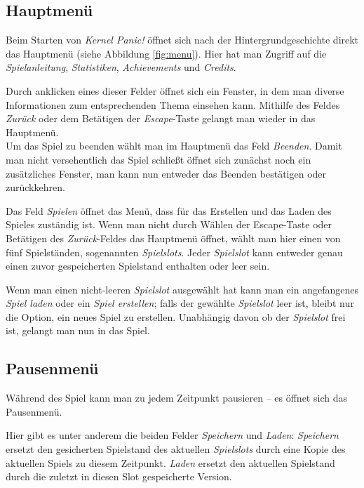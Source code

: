 \subsection{Hauptmenü}\label{sec:menu-main}

Beim Starten von \textit{Kernel Panic!} öffnet sich nach der Hintergrundgeschichte direkt das Hauptmenü (siehe Abbildung \ref{fig:menu}). Hier hat man Zugriff auf die \textit{Spielanleitung}, \textit{Statistiken}, \textit{Achievements} und \textit{Credits}.

Durch anklicken eines dieser Felder öffnet sich ein Fenster, in dem man diverse
Informationen zum entsprechenden Thema einsehen kann. Mithilfe des Feldes
\textit{Zurück} oder dem Betätigen der \textit{Escape}-Taste gelangt man wieder in das Hauptmenü.\\
Um das Spiel zu beenden wählt man im Hauptmenü das Feld \textit{Beenden}. Damit man nicht versehentlich das Spiel schließt öffnet sich zunächst noch ein zusätzliches Fenster, man kann nun entweder das Beenden bestätigen oder zurückkehren.

Das Feld \textit{Spielen} öffnet das Menü, dass für das Erstellen und das Laden des Spieles zuständig ist. Wenn man nicht durch Wählen der Escape-Taste oder Betätigen des \textit{Zurück}-Feldes das Hauptmenü öffnet, wählt man hier einen von fünf Spielständen, sogenannten \textit{Spielslots}. Jeder \textit{Spielslot} kann entweder genau einen zuvor gespeicherten Spielstand enthalten oder leer sein.

Wenn man einen nicht-leeren \textit{Spielslot} ausgewählt hat kann man
ein angefangenes \textit{Spiel laden} oder ein \textit{Spiel erstellen}; falls
der gewählte \textit{Spielslot} leer ist, bleibt nur die Option, ein neues Spiel zu erstellen.
Unabhängig davon ob der \textit{Spielslot} frei ist, gelangt man nun in das Spiel.


\subsection{Pausenmenü}\label{sec:menu-pause}

Während des Spiel kann man zu jedem Zeitpunkt pausieren -- es öffnet sich das
Pausenmenü.

Hier gibt es unter anderem die beiden Felder \textit{Speichern} und
\textit{Laden}:
\textit{Speichern} ersetzt den gesicherten Spielstand des aktuellen \textit{Spielslots} durch eine Kopie des aktuellen Spiels zu diesem Zeitpunkt.
\textit{Laden} ersetzt den aktuellen Spielstand durch die zuletzt in diesen
Slot gespeicherte Version.

